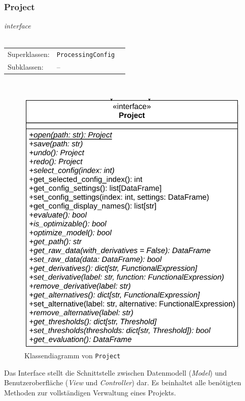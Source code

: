 \documentclass{article}
\begin{document}
\newpage
\subsubsection*{\large{\textbf{Project}\label{cls:Project}}}
\textit{\flqq{}interface\frqq}\normalsize\\\\
\begin{tabular}{lll}
 Superklassen: & \texttt{ProcessingConfig}\\
 Subklassen: & --
\end{tabular}\\
\begin{figure}[H]%
    \centering
    \includegraphics[width=13cm]{entwurf/Entwurf_dokument/img/cls/model/Project.png}
    \caption{Klassendiagramm von \texttt{Project}}
\end{figure}

Das Interface stellt die Schnittstelle zwischen Datenmodell (\emph{Model}) und Benutzeroberfläche (\emph{View} und \emph{Controller}) dar. Es beinhaltet alle benötigten Methoden zur vollständigen Verwaltung eines Projekts.
\\\\
\end{document}
